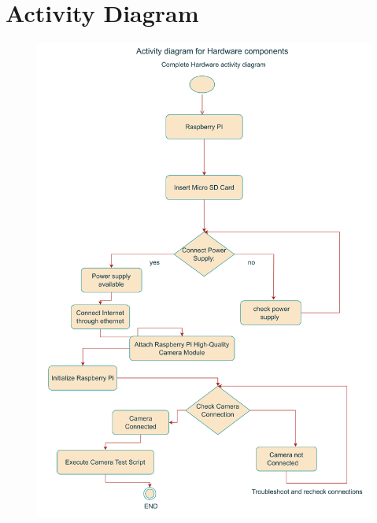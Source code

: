 \documentclass[11pt]{article}
\begin{document}
\section{Activity Diagram}
\begin{figure}[H]
    \centering
    \includegraphics[width=.90\textwidth]{activity_AA.drawio-1.png}
\end{figure}
\end{document}
